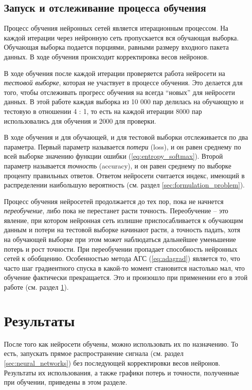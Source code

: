 \documentclass[a4paper,12pt]{article}
\theoremstyle{remark}
\begin{document}
 	\subsection{Запуск и отслеживание процесса обучения}
	Процесс обучения нейронных сетей является итерационным процессом. На каждой итерации через нейронную сеть пропускается вся обучающая выборка. Обучающая выборка подается порциями, равными размеру входного пакета данных. В ходе обучения происходит корректировка весов нейронов.
	
	В ходе обучения после каждой итерации проверяется работа нейросети на \textit{тестовой выборке}, которая не участвует в процессе обучения. Это делается для того, чтобы отслеживать прогресс обучения на всегда ``новых'' для нейросети данных. В этой работе каждая выборка из 10 000 пар делилась на обучающую и тестовую в отношении 4 : 1, то есть на каждой итерации 8000 пар использовались для обучения и 2000 для проверки.
	
	В ходе обучения и для обучающей, и для тестовой выборки отслеживается по два параметра. Первый параметр называется \textit{потери} (loss), и он равен среднему по всей выборке значению функции ошибки (\ref{eq:entropy_softmax}). Второй параметр называется \textit{точность} (accuracy), и он равен среднему по выборке проценту правильных ответов. Ответом нейросети считается индекс, имеющий в распределении наибольшую вероятность (см. раздел \ref{sec:formulation_problem}).
	
	Процесс обучения нейросетей продолжается до тех пор, пока не начнется \textit{переобучение}, либо пока не перестанет расти точность. Переобучение -- это явление, при котором нейронная сеть излишне приспосабливается к обучающим данным и потери на тестовой выборке начинают расти, а точность падать, хотя на обучающей выборке при этом может наблюдаться дальнейшее уменьшение потерь и рост точности. При переобучении пропадает способность нейронных сетей к обобщению. Особенностью метода АГС (\ref{eq:adagrad}) является то, что часто шаг градиентного спуска в какой-то момент становится настолько мал, что обучение фактически прекращается. Это и произошло при применении его в этой работе (см. раздел \ref{sec:results}).
	
	\newpage
	\section{Результаты}
	\label{sec:results}
	
	После того как нейросети обучены, можно использовать их по назначению. То есть, запускать прямое распространение сигнала (см. раздел \ref{sec:neural_networks}) без последующей корректировки весов нейронов. Результаты их использования, а также графики потерь и точности, полученные при обучении, приведены в этом разделе.
	
\end{document}
